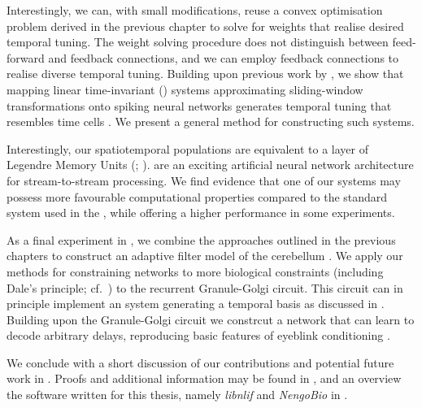 Interestingly, we can, with small modifications, reuse a convex optimisation problem derived in the previous chapter to solve for weights that realise desired temporal tuning.
The weight solving procedure does not distinguish between feed-forward and feedback connections, and we can employ feedback connections to realise diverse temporal tuning.
Building upon previous work by \citet{voelker2018improving}, we show that mapping linear time-invariant (\LTI) systems approximating sliding-window transformations onto spiking neural networks generates temporal tuning that resembles time cells \citep{pastalkova2008internally,howard2014unified,tiganj2016sequential}.
We present a general method for constructing such \LTI systems.

Interestingly, our spatiotemporal \NEF populations are equivalent to a layer of Legendre Memory Units (\LMUpl; \cite{voelker2019lmu}).
\LMUpl are an exciting artificial neural network architecture for stream-to-stream processing.
We find evidence that one of our \LTI systems may possess more favourable computational properties compared to the standard \LTI system used in the \LMU, while offering a higher performance in some experiments.

As a final experiment in , we combine the approaches outlined in the previous chapters to construct an adaptive filter model of the cerebellum \citep{fujita1982adaptive}.
We apply our methods for constraining \NEF networks to more biological constraints (including Dale's principle; cf.~) to the recurrent Granule-Golgi circuit.
This circuit can in principle implement an \LTI system generating a temporal basis as discussed in .
Building upon the Granule-Golgi circuit we constrcut a network that can learn to decode arbitrary delays, reproducing basic features of eyeblink conditioning \citep[e.g.,][]{heiney2014cerebellardependent}.

We conclude with a short discussion of our contributions and potential future work in .
Proofs and additional information may be found in , and an overview the software written for this thesis, namely \emph{libnlif} and \emph{NengoBio} in .

